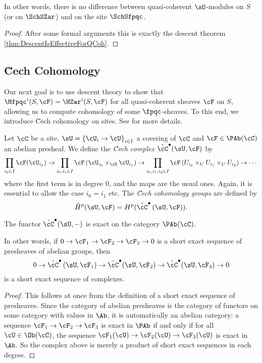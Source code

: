 In other words, there is no difference between quasi-coherent $\sO$-modules on $S$ (or on $\SchSZar$) and on the site $\SchSfpqc$.
  
\begin{proof} 
After some formal arguments this is exactly the descent theorem \ref{thm:DescentIsEffectiveForQCoh}.
\end{proof}
  
\subsection{\u Cech Cohomology}

Our next goal is to use descent theory to show that $\Hfpqc^i(S, \cF) = \HZar^i(S, \cF)$ for all quasi-coherent  sheaves $\cF$ on $S$, allowing us to compute cohomology of some $\fpqc$-sheaves.  To this end, we introduce \u Cech cohomology on sites. See \cite{Artin} for more details.
 
\begin{defi} 
Let $\cC$ be a site, $\sU=\left\{\cU_i\to \cU\right\}_{i\in I}$ a covering of $\cC$ and $\cF\in \PAb(\cC)$ an abelian presheaf. We define the \emph{\u Cech complex} $\check{\cC}^\bullet(\sU, \cF)$ by 
$$ 
 \prod_{i_0\in I}\cF(\cU_{i_0}) \to \prod_{i_0, i_1\in I}\cF\left(\cU_{i_0}\times_{\cU} \cU_{i_1}\right) \to \prod_{i_0, i_1, i_2 \in I} \cF\left(U_{i_0}\times_U U_{i_1} \times_U U_{i_2}\right) \to \cdots
$$
where the first term is in degree 0, and the maps are the usual ones. Again, it is essential to allow the case $i_0 = i_1$ etc. The \emph{\u Cech cohomology groups} are defined by
$$
\check{H}^p(\sU, \cF)= H^p(\check{\cC}^\bullet\left(\sU, \cF\right)).
$$
\end{defi}

\begin{lem} 
The functor $\check{\cC}^\bullet(\sU, -)$ is exact on the category $\PAb(\cC)$. 
\end{lem}	
  
In other words, if $0\to \cF_1\to \cF_2\to \cF_3\to 0$ is a short exact sequence of presheaves of abelian groups, then  
$$
0 \to \check{\cC}^\bullet\left(\sU, \cF_1\right) \to\check{\cC}^\bullet(\sU, \cF_2) \to \check{\cC}^\bullet(\sU, \cF_3)\to 0 
$$
is a short exact sequence of complexes.
  
\begin{proof}
This follows at once from the definition of a short exact sequence of presheaves. Since the category of abelian presheaves is the category of functors on some category with values in $\Ab$, it is automatically an abelian category: a sequence $\cF_1\to \cF_2\to \cF_3$ is exact in $\PAb$ if and only if for all $\cU\in \Ob(\cC)$, the sequence $\cF_1(\cU)\to \cF_2(\cU)\to \cF_3(\cU)$ is exact in $\Ab$. So the complex above is merely a product of short exact sequences in each degree.
  \end{proof}
  
